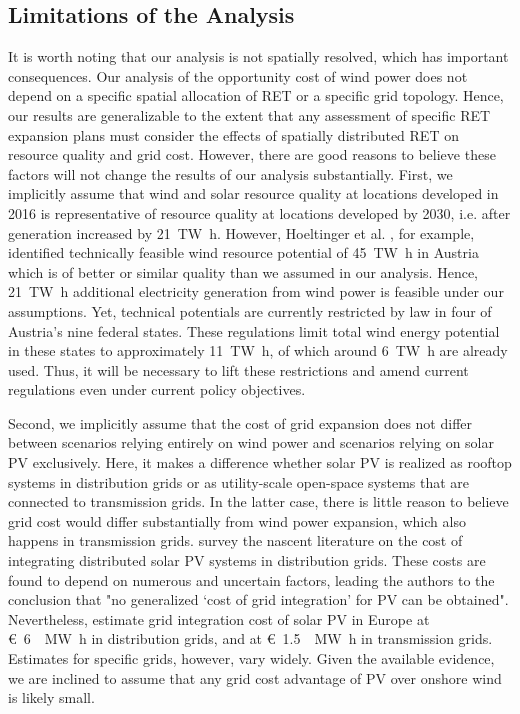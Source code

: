 \documentclass[review, 3p, times, 12pt, authoryear]{elsarticle}
\begin{document}
    \subsection{Limitations of the Analysis} \label{subsec:limitations}
    It is worth noting that our analysis is not spatially resolved, which has important consequences.
    Our analysis of the opportunity cost of wind power does not depend on a specific spatial allocation of RET or a specific grid topology. Hence, our results are generalizable to the extent that any assessment of specific RET expansion plans must consider the effects of spatially distributed RET on resource quality and grid cost.
    However, there are good reasons to believe these factors will not change the results of our analysis substantially.
    First, we implicitly assume that wind and solar resource quality at locations developed in 2016 is representative of resource quality at locations developed by 2030, i.e. after generation increased by \SI{21}{\tera\watt\hour}.
    However, Hoeltinger et al. \cite{Hoeltinger2016}, for example, identified technically feasible wind resource potential of \SI{45}{\tera\watt\hour} in Austria which is of better or similar quality than we assumed in our analysis.
    Hence, \SI{21}{\tera\watt\hour} additional electricity generation from wind power is feasible under our assumptions.
    Yet, technical potentials are currently restricted by law in four of Austria's nine federal states. These regulations limit total wind energy potential in these states to approximately \SI{11}{\tera\watt\hour}, of which around \SI{6}{\tera\watt\hour} are already used.
    Thus, it will be necessary to lift these restrictions and amend current regulations even under current policy objectives.

    Second, we implicitly assume that the cost of grid expansion does not differ between scenarios relying entirely on wind power and scenarios relying on solar PV exclusively.
    Here, it makes a difference whether solar PV is realized as rooftop systems in distribution grids or as utility-scale open-space systems that are connected to transmission grids.
    In the latter case, there is little reason to believe grid cost would differ substantially from wind power expansion, which also happens in transmission grids.
    \cite{Horowitz2018} survey the nascent literature on the cost of integrating distributed solar PV systems in distribution grids.
    These costs are found to depend on numerous and uncertain factors, leading the authors to the conclusion that "no generalized `cost of grid integration' for PV can be obtained".
    Nevertheless, \cite{Fuerstenwerth2015} estimate grid integration cost of solar PV in Europe at \SI[per-mode=symbol,sticky-per, bracket-unit-denominator=false]{6}[\euro]{\per\mega\watt\hour} in distribution grids, and at \SI[per-mode=symbol,sticky-per, bracket-unit-denominator=false]{1.5}[\euro]{\per\mega\watt\hour} in transmission grids.
    Estimates for specific grids, however, vary widely.
    Given the available evidence, we are inclined to assume that any grid cost advantage of PV over onshore wind is likely small.
\end{document}
